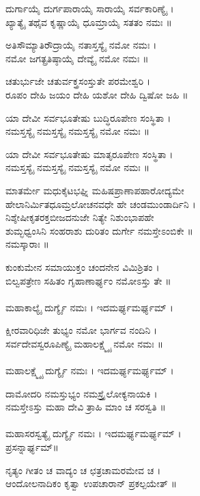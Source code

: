 ದುರ್ಗಾಯೈ ದುರ್ಗಪಾರಾಯೈ ಸಾರಾಯೈ ಸರ್ವಕಾರಿಣ್ಯೈ ।\\
ಖ್ಯಾತ್ಯೈ ತಥೈವ ಕೃಷ್ಣಾಯೈ ಧೂಮ್ರಾಯೈ ಸತತಂ ನಮಃ ॥

ಅತಿಸೌಮ್ಯಾತಿರೌದ್ರಾಯೈ ನತಾಸ್ತಸ್ಯೈ ನಮೋ ನಮಃ ।\\
ನಮೋ ಜಗತ್ಪ್ರತಿಷ್ಠಾಯೈ ದೇವ್ಯೈ ನಮೋ ನಮಃ ॥

ಚತುರ್ಭುಜೇ ಚತುರ್ವಕ್ತ್ರಸಂಸ್ತುತೇ ಪರಮೇಶ್ವರಿ ।\\
ರೂಪಂ ದೇಹಿ ಜಯಂ ದೇಹಿ ಯಶೋ ದೇಹಿ ದ್ವಿಷೋ ಜಹಿ ॥

ಯಾ ದೇವೀ ಸರ್ವಭೂತೇಷು ಬುದ್ಧಿರೂಪೇಣ ಸಂಸ್ಥಿತಾ ।\\
ನಮಸ್ತಸ್ಯೈ ನಮಸ್ತಸ್ಯೈ ನಮಸ್ತಸ್ಯೈ ನಮೋ ನಮಃ ॥

ಯಾ ದೇವೀ ಸರ್ವಭೂತೇಷು ಮಾತೃರೂಪೇಣ ಸಂಸ್ಥಿತಾ ।\\
ನಮಸ್ತಸ್ಯೈ ನಮಸ್ತಸ್ಯೈ ನಮಸ್ತಸ್ಯೈ ನಮೋ ನಮಃ ॥

ಮಾತರ್ಮೇ ಮಧುಕೈಟಭಘ್ನಿ ಮಹಿಷಪ್ರಾಣಾಪಹಾರೋದ್ಯಮೇ \\
ಹೇಲಾನಿರ್ಮಿತಧೂಮ್ರಲೋಚನವಧೇ ಹೇ ಚಂಡಮುಂಡಾರ್ದಿನಿ ।\\
\newpage
ನಿಶ್ಶೇಷೀಕೃತರಕ್ತಬೀಜದನುಜೇ ನಿತ್ಯೇ ನಿಶುಂಭಾಪಹೇ \\
ಶುಮ್ಭಧ್ವಂಸಿನಿ ಸಂಹರಾಶು ದುರಿತಂ ದುರ್ಗೇ ನಮಸ್ತೇಽಂಬಿಕೇ ॥\\
ನಮಸ್ಕಾರಾಃ ॥

ಕುಂಕುಮೇನ ಸಮಾಯುಕ್ತಂ ಚಂದನೇನ ವಿಮಿಶ್ರಿತಂ ।\\
ಬಿಲ್ವಪತ್ರೇಣ ಸಹಿತಂ ಗೃಹಾಣಾರ್ಘ್ಯಂ ನಮೋಽಸ್ತು ತೇ ॥\\
\\
ಮಹಾಕಾಲ್ಯೈ ದುರ್ಗ್ಯೈ ನಮಃ । ಇದಮರ್ಘ್ಯಮರ್ಘ್ಯಮ್ ।

ಕ್ಷೀರವಾರಿಧಿಜೇ ತುಭ್ಯಂ ನಮೋ ಭಾರ್ಗವ ನಂದಿನಿ ।\\
ಸರ್ವದೇವಸ್ವರೂಪಿಣ್ಯೈ ಮಹಾಲಕ್ಷ್ಮ್ಯೈ ನಮೋ ನಮಃ ॥ \\
\\
ಮಹಾಲಕ್ಷ್ಮ್ಯೈ ದುರ್ಗ್ಯೈ ನಮಃ । ಇದಮರ್ಘ್ಯಮರ್ಘ್ಯಮ್ ।

ದಾಮೋದರಿ ನಮಸ್ತುಭ್ಯಂ ನಮಸ್ತ್ರೈಲೋಕ್ಯನಾಯಕಿ ।\\
ನಮಸ್ತೇಽಸ್ತು ಮಹಾ ದೇವಿ ತ್ರಾಹಿ ಮಾಂ ಚ ಸರಸ್ವತಿ ॥\\
\\
ಮಹಾಸರಸ್ವತ್ಯೈ ದುರ್ಗ್ಯೈ ನಮಃ । ಇದಮರ್ಘ್ಯಮರ್ಘ್ಯಮ್ ।\\
ಪ್ರಸನ್ನಾರ್ಘ್ಯಮ್॥

ನೃತ್ಯಂ ಗೀತಂ ಚ ವಾದ್ಯಂ ಚ ಛತ್ರಚಾಮರಮೇವ ಚ ।\\
ಆಂದೋಲನಾದಿಕಂ ಕೃತ್ವಾ ಉಪಚಾರಾನ್ ಪ್ರಕಲ್ಪಯೇತ್ ॥

